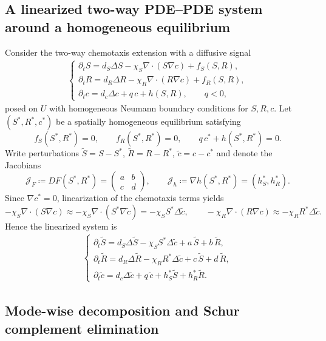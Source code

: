 \documentclass[pdflatex,sn-mathphys-ay]{sn-jnl}
\theoremstyle{thmstyleone}
\theoremstyle{definition}
\theoremstyle{remark}
\begin{document}
\subsection{A linearized two-way PDE--PDE system around a homogeneous equilibrium}
\label{app:closure_linearization}

Consider the two-way chemotaxis extension with a diffusive signal
\begin{align}
\label{eq:app_twoway_c_pde}
\begin{cases}
\partial_t S = d_S\Delta S - \chi_S\nabla\!\cdot(S\nabla c) + f_S(S,R),\\[2pt]
\partial_t R = d_R\Delta R - \chi_R\nabla\!\cdot(R\nabla c) + f_R(S,R),\\[2pt]
\partial_t c = d_c\Delta c + q\,c + h(S,R),\qquad q<0,
\end{cases}
\end{align}
posed on $U$ with homogeneous Neumann boundary conditions for $S,R,c$.
Let $(S^*,R^*,c^*)$ be a spatially homogeneous equilibrium satisfying
\[
f_S(S^*,R^*)=0,\qquad f_R(S^*,R^*)=0,\qquad q\,c^*+h(S^*,R^*)=0.
\]
Write perturbations $\tilde S=S-S^*$, $\tilde R=R-R^*$, $\tilde c=c-c^*$ and denote the Jacobians
\[
\mathcal{J}_F \coloneqq DF(S^*,R^*)=
\begin{pmatrix}
a & b\\ c & d
\end{pmatrix},
\qquad
\mathcal{J}_h \coloneqq \nabla h(S^*,R^*)=(h_S^*,h_R^*).
\]
Since $\nabla c^*=0$, linearization of the chemotaxis terms yields
\[
-\chi_S\nabla\cdot(S\nabla c) \approx -\chi_S\nabla\cdot(S^*\nabla \tilde c)= -\chi_S S^*\Delta \tilde c,
\qquad
-\chi_R\nabla\cdot(R\nabla c) \approx -\chi_R R^*\Delta \tilde c.
\]
Hence the linearized system is
\begin{align}
\label{eq:app_linearized_system}
\begin{cases}
\partial_t \tilde S = d_S\Delta \tilde S - \chi_S S^*\Delta \tilde c + a\,\tilde S + b\,\tilde R,\\[2pt]
\partial_t \tilde R = d_R\Delta \tilde R - \chi_R R^*\Delta \tilde c + c\,\tilde S + d\,\tilde R,\\[2pt]
\partial_t \tilde c = d_c\Delta \tilde c + q\,\tilde c + h_S^*\tilde S + h_R^*\tilde R.
\end{cases}
\end{align}

\subsection{Mode-wise decomposition and Schur complement elimination}
\label{app:closure_schur}
\end{document}

